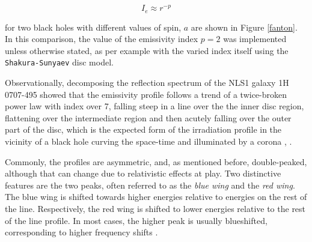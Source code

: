 \documentclass[fleqn,usenatbib,useAMS]{mnras}
\begin{document}
\begin{equation}
    I_{e} \approx r^{-p}
    \label{intensity}
\end{equation}

for two black holes with different values of spin, $a$ are shown in Figure \ref{fanton}. In this comparison, the value of the emissivity index $p = 2$ was implemented unless otherwise stated, as per example with the varied index itself using the {\tt Shakura-Sunyaev} disc model.

Observationally, decomposing the reflection spectrum of the NLS1 galaxy 1H 0707-495 \cite{wilkins2011determination} showed that the emissivity profile follows a trend of a twice-broken power law with index over 7, falling steep in a line over the the inner disc region, flattening over the intermediate region and then acutely falling over the outer part of the disc, which is the expected form of the irradiation profile in the vicinity of a black hole curving the space-time and illuminated by a corona \cite{suebsuwong2006gravitational}, \cite{wilkins2015driving}.

Commonly, the profiles are asymmetric, and, as mentioned before, double-peaked, although that can change due to relativistic effects at play. Two distinctive features are the two peaks, often referred to as the \textit{blue wing} and the \textit{red wing}. The blue wing is shifted towards higher energies relative to energies on the rest of the line. Respectively, the red wing is shifted to lower energies relative to the rest of the line profile. In most cases, the higher peak is usually blueshifted, corresponding to higher frequency shifts \cite{fanton1997detecting}. 
\end{document}
